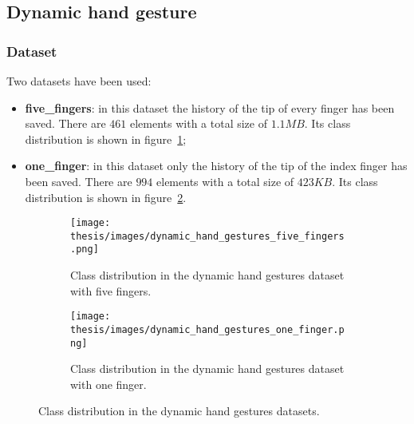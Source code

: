 \documentclass[../thesis.tex]{subfiles}
\begin{document}
\subsection{Dynamic hand gesture}

\subsubsection{Dataset}
Two datasets have been used:
\begin{itemize}
    \item \textbf{five\_fingers}: in this dataset the history of the tip of every finger has been saved. There are $461$ elements with a total size of $1.1MB$. Its class distribution is shown in figure~\ref{fig:class_distribution_dynamic_hand_gestures_five_fingers};
    \item \textbf{one\_finger}: in this dataset only the history of the tip of the index finger has been saved. There are $994$ elements with a total size of $423KB$. Its class distribution is shown in figure~\ref{fig:class_distribution_dynamic_hand_gestures_one_finger}.
\end{itemize}

\begin{figure}[H]
    \centering
    \begin{subfigure}[b]{0.45\textwidth}
        \centering
        \texttt{[image: thesis/images/dynamic\_hand\_gestures\_five\_fingers.png]}
        \caption{Class distribution in the dynamic hand gestures dataset with five fingers.}
        \label{fig:class_distribution_dynamic_hand_gestures_five_fingers}
    \end{subfigure}
    \hfill
    \begin{subfigure}[b]{0.45\textwidth}
        \centering
        \texttt{[image: thesis/images/dynamic\_hand\_gestures\_one\_finger.png]}
        \caption{Class distribution in the dynamic hand gestures dataset with one finger.}
        \label{fig:class_distribution_dynamic_hand_gestures_one_finger}
    \end{subfigure}
    \caption{Class distribution in the dynamic hand gestures datasets.}
    \label{fig:my_label}
\end{figure}
\end{document}
